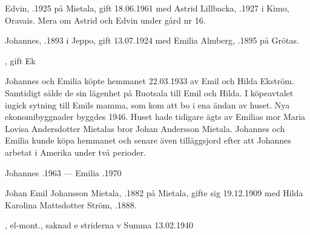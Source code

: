 
Edvin, .1925 på Mietala, gift  18.06.1961 med Astrid Lillbacka, .1927 i Kimo, Oravais. Mera om Astrid och Edvin under gård nr 16.\jhvspace{}



Johannes, .1893 i Jeppo,  gift 13.07.1924 med Emilia Almberg, .1895 på Grötas.
\begin{jhchildren}
  \item {}
  \item {}, gift Ek
\end{jhchildren}

Johannes och Emilia köpte hemmanet 22.03.1933 av Emil och Hilda Ekström. Samtidigt sålde de sin lägenhet på  Ruotsala till Emil och Hilda. I köpeavtalet ingick sytning till Emils mamma, som kom att bo i ena ändan av huset. Nya ekonomibyggnader byggdes 1946. Huset hade tidigare ägts av Emilias mor Maria Lovisa Andersdotter Mietalas bror Johan Andersson Mietala. Johannes och Emilia kunde köpa hemmanet och senare även tilläggsjord efter att Johannes arbetat i Amerika under två perioder.

Johannes .1963  ---  Emilia .1970


Johan Emil Johansson Mietala, .1882 på Mietala, gifte sig 19.12.1909  med Hilda Karolina Mattsdotter Ström, .1888.
\begin{jhchildren}
  \item {}
  \item {}, el-mont., saknad e striderna v Summa 13.02.1940
  \item {}
  \item {}
  \item {}
  \item {}
  \item {}
  \item {}
  \item {}
  \item {}
\end{jhchildren}

